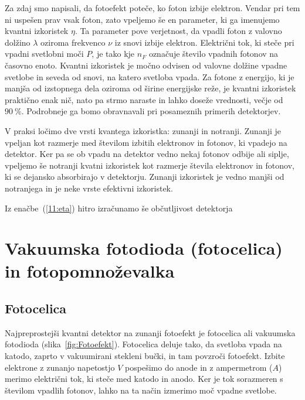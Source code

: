 Za zdaj smo napisali, da fotoefekt poteče, ko foton izbije elektron. Vendar pri tem ni 
uspešen prav vsak foton, zato vpeljemo še en parameter, ki ga imenujemo 
kvantni izkoristek $\eta$.
Ta parameter pove verjetnost, da vpadli foton z valovno dolžino $\lambda$ 
oziroma frekvenco $\nu$ iz snovi izbije elektron. 
Električni tok, ki steče pri vpadni svetlobni moči $P$, je tako
kje $n_F$ označuje število vpadnih fotonov na časovno enoto.
Kvantni izkoristek je močno odvisen od valovne dolžine vpadne svetlobe in seveda
od snovi, na katero svetloba vpada. Za fotone z energijo, ki je manjša od izstopnega 
dela oziroma od širine energijske reže, je kvantni izkoristek praktično enak nič, 
nato pa strmo naraste in lahko doseže vrednosti, večje od $90~\%$. Podrobneje ga bomo 
obravnavali pri posameznih primerih detektorjev.

\begin{remark}
V praksi ločimo dve vrsti kvantega izkoristka: zunanji in notranji. Zunanji je vpeljan kot 
razmerje med številom izbitih elektronov in fotonov, ki vpadejo na detektor. Ker pa se 
ob vpadu na detektor vedno nekaj fotonov odbije ali siplje, vpeljemo še notranji kvatni 
izkoristek kot razmerje števila elektronov in fotonov, ki se dejansko absorbirajo v detektorju.
Zunanji izkoristek je vedno manjši od notranjega in je neke vrste efektivni 
izkoristek.
\end{remark}

Iz enačbe~(\ref{11:eta}) hitro izračunamo še občutljivost detektorja 

\section{Vakuumska fotodioda (fotocelica) in fotopomnoževalka}
\subsection*{Fotocelica}
Najpreprostejši kvantni detektor na zunanji fotoefekt je fotocelica ali vakuumska fotodioda
(slika~\ref{fig:Fotoefekt}). Fotocelica deluje tako, da svetloba vpada na katodo, 
zaprto v vakuumirani stekleni bučki, in tam povzroči fotoefekt. Izbite elektrone 
z zunanjo napetostjo $V$ pospešimo do anode in z ampermetrom ($A$) 
merimo električni tok, ki steče med katodo in anodo. 
Ker je tok sorazmeren s številom vpadlih fotonov, lahko na ta 
način izmerimo moč vpadne svetlobe.

